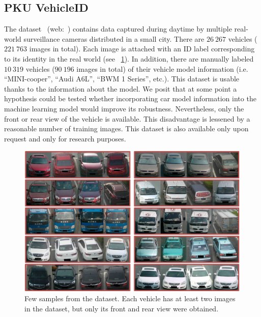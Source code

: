 \subsection{PKU VehicleID}
\label{ssec:DatasetPKUVehicleID}

The  dataset~\cite{liu2016deepreldist} (web:~\cite{webpkuvehicledataset}) contains data captured during daytime by multiple real-world surveillance cameras distributed in a small city. There are $26\ 267$ vehicles ($221\ 763$ images in total). Each image is attached with an ID label corresponding to its identity in the real world (see \figstr{}~\ref{fig:VehicleIDDataset}). In addition, there are manually labeled $10\ 319$ vehicles ($90\ 196$ images in total) of their vehicle model information (i.e. “MINI-cooper”, “Audi A6L”, “BWM 1 Series”, etc.). This dataset is usable thanks to the information about the model. We posit that at some point a hypothesis could be tested whether incorporating car model information into the machine learning model would improve its robustness. Nevertheless, only the front or rear view of the vehicle is available. This disadvantage is lessened by a reasonable number of training images. This dataset is also available only upon request and only for research purposes.

\begin{figure}[t]
    \centerline{\includegraphics[width=0.5\linewidth]{figures/datasets/vehicleid_overview.pdf}}
    \caption[ dataset]{Few samples from the  dataset. Each vehicle has at least two images in the dataset, but only its front and rear view were obtained. }
    \label{fig:VehicleIDDataset}
\end{figure}

